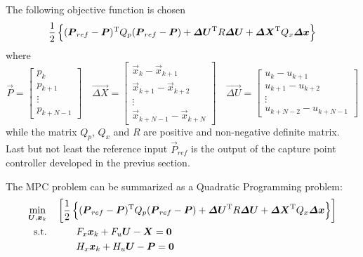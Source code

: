 The following objective function is chosen
\[
\frac{1}{2} \left\{ (\boldsymbol{P}_{ref} - \boldsymbol{P})^{\mathrm{T}} Q_p (\boldsymbol{P}_{ref} - \boldsymbol{P}) +
\boldsymbol{\Delta U} ^{\mathrm{T}} R \boldsymbol{\Delta U} + 
\boldsymbol{\Delta X} ^{\mathrm{T}} Q_x \boldsymbol{\Delta x} \right\}
\]
where
\[
\vec{P} =
\begin{bmatrix}
  p_k \\
  p_{k + 1} \\
  \vdots \\
  p_{k + N -1}
\end{bmatrix} \quad
\vec{\Delta X} =
\begin{bmatrix}
  \vec{x}_k - \vec{x}_{k+1} \\
  \vec{x}_{k + 1} - \vec{x}_{k + 2} \\
  \vdots \\
  \vec{x}_{k + N - 1} - \vec{x}_{k + N}
\end{bmatrix} \quad
\vec{\Delta U} =
\begin{bmatrix}
  u_k - u_{k+1} \\
  u_{k + 1} - u_{k + 2} \\
  \vdots \\
  u_{k + N - 2} - u_{k + N - 1}
\end{bmatrix}
\]
while the matrix $Q_p$, $Q_x$ and $R$ are positive and non-negative definite matrix.
Last but not least the reference input $\vec{P}_{ref}$ is the output of the capture point controller
developed in the previus section.
\par
The MPC problem can be summarized as a Quadratic Programming problem:
\[
\begin{split}
  \min_{\boldsymbol{U}, \boldsymbol{x}_k} &  \quad \left[\frac{1}{2} \left\{ (\boldsymbol{P}_{ref} - \boldsymbol{P})^{\mathrm{T}} Q_p (\boldsymbol{P}_{ref} - \boldsymbol{P}) +
\boldsymbol{\Delta U} ^{\mathrm{T}} R \boldsymbol{\Delta U} + 
\boldsymbol{\Delta X} ^{\mathrm{T}} Q_x \boldsymbol{\Delta x} \right\} \right ]\\
  \text{s.t.} & \quad \quad \quad  F_{x} \boldsymbol{x}_k + F_{u} \boldsymbol{U} - \boldsymbol{X} = \boldsymbol{0}\\
  & \quad \quad \quad  H_{x} \boldsymbol{x}_k + H_{u} \boldsymbol{U} - \boldsymbol{P} = \boldsymbol{0}
\end{split}
\]
\newpage
